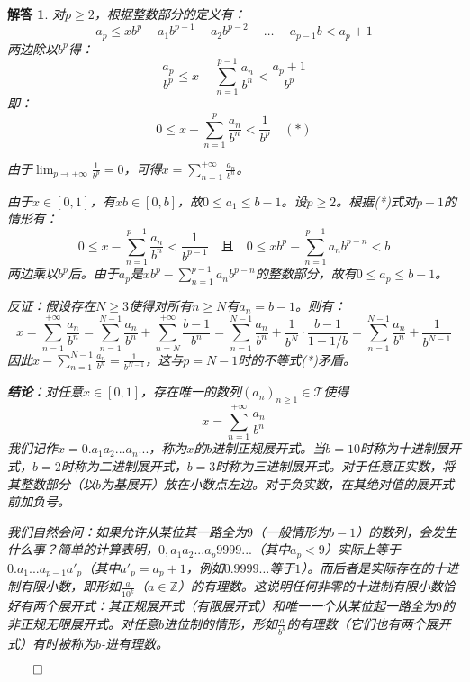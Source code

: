 \documentclass[12pt,UTF8]{ctexbook}
\theoremstyle{exercisestyle}
\theoremstyle{solutionstyle}
\newtheorem*{solution*}{解答}
\newenvironment{solution}
  {\begin{solution*}}
  {\hfill\ensuremath{\qed}\end{solution*}}
\begin{document}
\begin{solution}
对$p \ge 2$，根据整数部分的定义有：
$$a_p \leqslant x b^p - a_1 b^{p-1} - a_2 b^{p-2} - \dots - a_{p-1} b < a_p + 1$$
两边除以$b^p$得：
$$\frac{a_p}{b^p} \leqslant x - \sum_{n=1}^{p-1} \frac{a_n}{b^n} < \frac{a_p+1}{b^p}$$
即：
$$0 \leqslant x - \sum_{n=1}^p \frac{a_n}{b^n} < \frac{1}{b^p} \quad (*)$$

由于$\lim_{p \to +\infty} \frac{1}{b^p} = 0$，可得$x = \sum_{n=1}^{+\infty} \frac{a_n}{b^n}$。

由于$x \in [0,1]$，有$xb \in [0,b]$，故$0 \leq a_1 \leq b-1$。设$p \geq 2$。根据(*)式对$p-1$的情形有：
$$0 \leqslant x - \sum_{n=1}^{p-1} \frac{a_n}{b^n} < \frac{1}{b^{p-1}} \quad \text{且} \quad 0 \leqslant x b^p - \sum_{n=1}^{p-1} a_n b^{p-n} < b$$
两边乘以$b^p$后。由于$a_p$是$xb^p-\sum_{n=1}^{p-1}a_nb^{p-n}$的整数部分，故有$0\leqslant a_p\leqslant b-1$。

反证：假设存在$N \ge 3$使得对所有$n \geq N$有$a_n = b - 1$。则有：
$$x = \sum_{n=1}^{+\infty} \frac{a_n}{b^n} = \sum_{n=1}^{N-1} \frac{a_n}{b^n} + \sum_{n=N}^{+\infty} \frac{b-1}{b^n} = \sum_{n=1}^{N-1} \frac{a_n}{b^n} + \frac{1}{b^N} \cdot \frac{b-1}{1-1/b} = \sum_{n=1}^{N-1} \frac{a_n}{b^n} + \frac{1}{b^{N-1}}$$
因此$x - \sum_{n=1}^{N-1} \frac{a_n}{b^n} = \frac{1}{b^{N-1}}$，这与$p = N-1$时的不等式(*)矛盾。

\textbf{结论}：对任意$x \in [0,1]$，存在唯一的数列$(a_n)_{n \geq 1} \in \mathcal T$使得
$$x = \sum_{n=1}^{+\infty} \frac{a_n}{b^n}$$
我们记作$x = 0.a_1 a_2 ... a_n ...$，称为$x$的$b$进制正规展开式。当$b = 10$时称为十进制展开式，$b = 2$时称为二进制展开式，$b = 3$时称为三进制展开式。对于任意正实数，将其整数部分（以$b$为基展开）放在小数点左边。对于负实数，在其绝对值的展开式前加负号。

我们自然会问：如果允许从某位其一路全为$9$（一般情形为$b-1$）的数列，会发生什么事？简单的计算表明，$0, a_1 a_2 ... a_p 9999...$（其中$a_p < 9$）实际上等于$0.a_1 ... a_{p-1} a'_p$（其中$a'_p = a_p + 1$，例如$0.9999\ldots$等于$1$）。而后者是实际存在的十进制有限小数，即形如$\frac{a}{10^k}$（$a \in \mathbb{Z}$）的有理数。这说明任何非零的十进制有限小数恰好有两个展开式：其正规展开式（有限展开式）和唯一一个从某位起一路全为$9$的非正规无限展开式。对任意$b$进位制的情形，形如$\frac{a}{b^k}$的有理数（它们也有两个展开式）有时被称为$b$-进有理数。

\end{solution}
\end{document}

